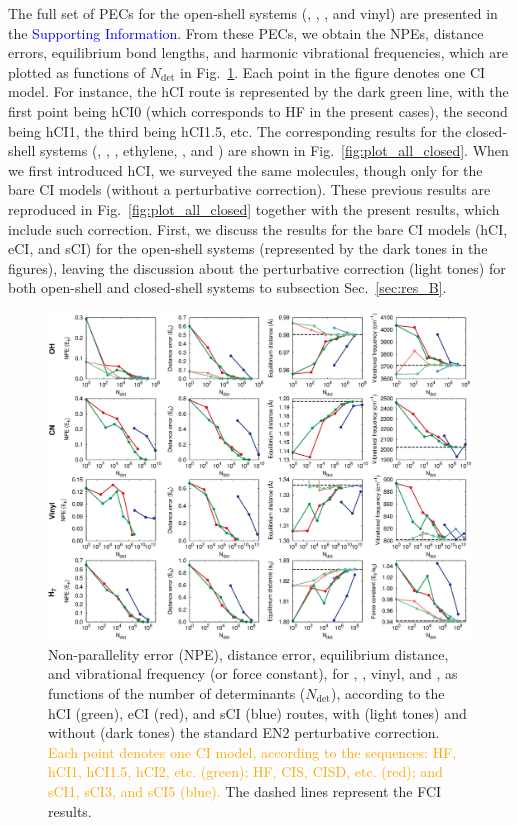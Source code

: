 \documentclass[aip,jcp,reprint,noshowkeys,superscriptaddress]{revtex4-1}
\newcommand{\fk}[1]{\textcolor{orange}{#1}}
\newcommand{\SupInf}{\textcolor{blue}{Supporting Information}}
\newcommand{\Ndet}{N_\text{det}}
\begin{document}
The full set of PECs for the open-shell systems (, , , and vinyl) are presented in the {\SupInf}.
From these PECs, we obtain the NPEs, distance errors, equilibrium bond lengths, and harmonic vibrational frequencies, which are plotted as functions of $\Ndet$ in Fig.~\ref{fig:plot_all}.
Each point in the figure denotes one CI model.
For instance, the hCI route is represented by the dark green line, with the first point being hCI0 (which corresponds to HF in the present cases), the second being hCI1, the third being hCI1.5, etc.
The corresponding results for the closed-shell systems (, , , ethylene, , and ) are shown in Fig.~\ref{fig:plot_all_closed}.
When we first introduced hCI, \cite{Kossoski_2022} we surveyed the same molecules, though only for the bare CI models (without a perturbative correction).
These previous results are reproduced in Fig.~\ref{fig:plot_all_closed} together with the present results, which include such correction.
First, we discuss the results for the bare CI models (hCI, eCI, and sCI) for the open-shell systems (represented by the dark tones in the figures),
leaving the discussion about the perturbative correction (light tones) for both open-shell and closed-shell systems to subsection Sec.~\ref{sec:res_B}.

\begin{figure}%
\includegraphics[width=1.0\linewidth]{plot_all}
\caption{
Non-parallelity error (NPE), distance error, equilibrium distance, and vibrational frequency (or force constant), for , , vinyl, and ,
as functions of the number of determinants ($\Ndet$), according to the hCI (green), eCI (red), and sCI (blue) routes,
with (light tones) and without (dark tones) the standard EN2 perturbative correction.
\fk{Each point denotes one CI model, according to the sequences: HF, hCI1, hCI1.5, hCI2, etc. (green); HF, CIS, CISD, etc. (red); and sCI1, sCI3, and sCI5 (blue).}
The dashed lines represent the FCI results.}
\label{fig:plot_all}
\end{figure}
\end{document}
